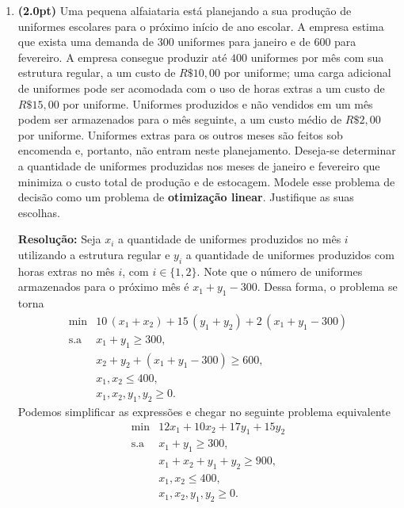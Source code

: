 \documentclass{article}
\begin{document}
\begin{enumerate}[label=$\blacktriangleright$ {\bf Questão \arabic*:},series=exerc,align=left]
\item {\bf (2.0pt)} Uma pequena alfaiataria está planejando a sua produção de uniformes escolares para o próximo início de ano escolar. A empresa estima que exista uma demanda de $300$ uniformes para janeiro e de $600$ para fevereiro. A empresa consegue produzir até $400$ uniformes por mês com sua estrutura regular, a um custo de $R\$ 10,00$ por uniforme; uma carga adicional de uniformes pode ser acomodada com o uso de horas extras a um custo de $R\$ 15,00$ por uniforme. Uniformes produzidos e não vendidos em um mês podem ser armazenados para o mês seguinte, a um custo médio de $R\$2,00$ por uniforme. Uniformes extras para os outros meses são feitos sob encomenda e, portanto, não entram neste planejamento. Deseja-se determinar a quantidade de uniformes produzidas nos meses de janeiro e fevereiro que minimiza o custo total de produção e de estocagem. Modele esse problema de decisão como um problema de {\bf otimização linear}. Justifique as suas escolhas.

\begin{framed}
{\bf Resolução:}
Seja $x_i$ a quantidade de uniformes produzidos no mês $i$ utilizando a estrutura regular e $y_i$ a quantidade de uniformes produzidos com horas extras no mês $i$, com $i\in\{1,2\}$. Note que o número de uniformes armazenados para o próximo mês é $x_1+y_1-300$. Dessa forma, o problema se torna
\[
\begin{array}{rl}
\min & 10\,(x_1+x_2)+15\,(y_1+y_2)+2\,(x_1+y_1-300)\\
\text{s.a} & x_1+y_1 \ge 300,\\
    & x_2+y_2+(x_1+y_1-300) \ge 600,\\
    & x_1,x_2 \le 400,\\
    & x_1,x_2,y_1,y_2 \ge 0.
\end{array}
\]
Podemos simplificar as expressões e chegar no seguinte problema equivalente
\[
\begin{array}{rl}
\min & 12 x_1 + 10 x_2 + 17 y_1 + 15 y_2 \\
\text{s.a} & x_1+y_1 \ge 300,\\
    & x_1+x_2+y_1+y_2 \ge 900,\\
    & x_1,x_2 \le 400,\\
    & x_1,x_2,y_1,y_2 \ge 0.
\end{array}
\]
\vspace{13cm}
\end{framed}


\end{enumerate}
\end{document}
